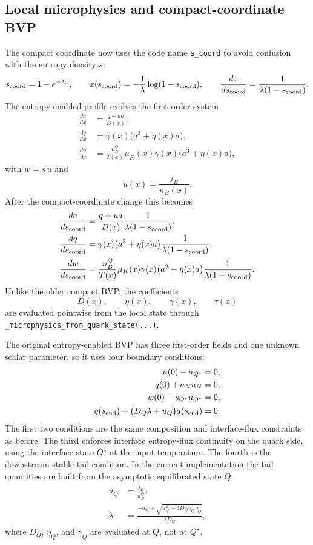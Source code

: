 \documentclass[11pt]{article}
\begin{document}
\subsection{Local microphysics and compact-coordinate BVP}
The compact coordinate now uses the code name \texttt{s\_coord} to avoid
confusion with the entropy density $s$:
\begin{equation}
s_{\rm coord}=1-e^{-\lambda x},\qquad
x(s_{\rm coord})=-\frac{1}{\lambda}\log(1-s_{\rm coord}),\qquad
\frac{dx}{ds_{\rm coord}}=\frac{1}{\lambda(1-s_{\rm coord})}.
\end{equation}
The entropy-enabled profile evolves the first-order system
\begin{align}
\frac{da}{dx} &= \frac{q+u a}{D(x)},\\
\frac{dq}{dx} &= \gamma(x)\bigl(a^3+\eta(x)a\bigr),\\
\frac{dw}{dx} &= \frac{n_B^Q}{T(x)}\mu_K(x)\gamma(x)\bigl(a^3+\eta(x)a\bigr),
\end{align}
with $w=s\,u$ and
\begin{equation}
u(x)=\frac{j_B}{n_B(x)}.
\end{equation}
After the compact-coordinate change this becomes
\begin{align}
\frac{da}{ds_{\rm coord}}
&= \frac{q+u a}{D(x)}\frac{1}{\lambda(1-s_{\rm coord})},\\
\frac{dq}{ds_{\rm coord}}
&= \gamma(x)\bigl(a^3+\eta(x)a\bigr)\frac{1}{\lambda(1-s_{\rm coord})},\\
\frac{dw}{ds_{\rm coord}}
&= \frac{n_B^Q}{T(x)}\mu_K(x)\gamma(x)\bigl(a^3+\eta(x)a\bigr)
\frac{1}{\lambda(1-s_{\rm coord})}.
\end{align}
Unlike the older compact BVP, the coefficients
\begin{equation}
D(x),\qquad \eta(x),\qquad \gamma(x),\qquad \tau(x)
\end{equation}
are evaluated pointwise from the local state through
\texttt{\_microphysics\_from\_quark\_state(...)}.

The original entropy-enabled BVP has three first-order fields and one unknown
scalar parameter, so it uses four boundary conditions:
\begin{align}
a(0)-a_{Q^\star} &= 0,\\
q(0)+a_Nu_N &= 0,\\
w(0)-s_{Q^\star}u_{Q^\star} &= 0,\\
q(s_{\rm end})+\bigl(D_Q\lambda+u_Q\bigr)a(s_{\rm end}) &= 0.
\end{align}
The first two conditions are the same composition and interface-flux
constraints as before. The third enforces interface entropy-flux continuity on
the quark side, using the interface state $Q^\star$ at the input temperature.
The fourth is the downstream stable-tail condition. In the current
implementation the tail quantities are built from the asymptotic equilibrated
state $Q$:
\begin{align}
u_Q &= \frac{j_B}{n_B^Q},\\
\lambda &= \frac{-u_Q+\sqrt{u_Q^2+4D_Q\gamma_Q\eta_Q}}{2D_Q},
\end{align}
where $D_Q$, $\eta_Q$, and $\gamma_Q$ are evaluated at $Q$, not at
$Q^\star$.
\end{document}
